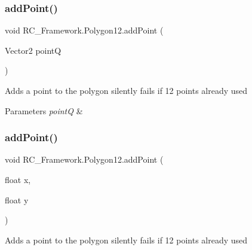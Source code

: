 \subsubsection{\texorpdfstring{add\+Point()}{addPoint()}\hspace{0.1cm}{\footnotesize\ttfamily [1/2]}}
{\footnotesize\ttfamily void R\+C\+\_\+\+Framework.\+Polygon12.\+add\+Point (\begin{DoxyParamCaption}\item[{Vector2}]{pointQ }\end{DoxyParamCaption})}



Adds a point to the polygon silently fails if 12 points already used 


\begin{DoxyParams}{Parameters}
{\em pointQ} & \\
\hline
\end{DoxyParams}
\mbox{\label{class_r_c___framework_1_1_polygon12_a249a0044355228c11129a72691f1f9ce}} 
\subsubsection{\texorpdfstring{add\+Point()}{addPoint()}\hspace{0.1cm}{\footnotesize\ttfamily [2/2]}}
{\footnotesize\ttfamily void R\+C\+\_\+\+Framework.\+Polygon12.\+add\+Point (\begin{DoxyParamCaption}\item[{float}]{x,  }\item[{float}]{y }\end{DoxyParamCaption})}



Adds a point to the polygon silently fails if 12 points already used 

\mbox{\label{class_r_c___framework_1_1_polygon12_ae0d2f0fb8ef452a5d8affebe08403f0c}} 
